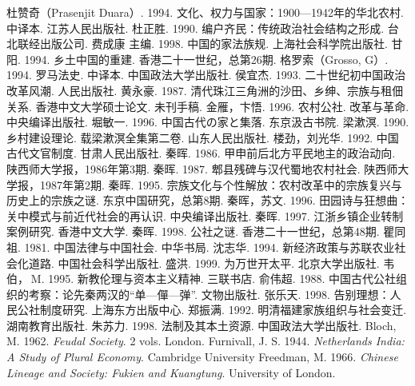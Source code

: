 \documentclass[a4paper,12pt,punct=kaiming,fontset=none]{ctexart}
\begin{document}
\begin{thebibliography}{99}
 杜赞奇（Prasenjit Duara）. 1994. 文化、权力与国家：1900—1942年的华北农村. 中译本. 江苏人民出版社.
 杜正胜. 1990. 编户齐民：传统政治社会结构之形成. 台北联经出版公司.
 费成康 主编. 1998. 中国的家法族规. 上海社会科学院出版社.
 甘阳. 1994. 乡土中国的重建. 香港二十一世纪，总第26期.
 格罗索（Grosso, G）. 1994. 罗马法史. 中译本. 中国政法大学出版社.
 侯宜杰. 1993. 二十世纪初中国政治改革风潮. 人民出版社.
 黄永豪. 1987. 清代珠江三角洲的沙田、乡绅、宗族与租佃关系. 香港中文大学硕士论文. 未刊手稿.
 金雁，卞悟. 1996. 农村公社. 改革与革命. 中央编译出版社.
 堀敏一. 1996. 中国古代の家と集落. 东京汲古书院.
 梁漱溟. 1990. 乡村建设理论. 载梁漱溟全集第二卷. 山东人民出版社.
 楼劲，刘光华. 1992. 中国古代文官制度. 甘肃人民出版社.
 秦晖. 1986. 甲申前后北方平民地主的政治动向. 陕西师大学报，1986年第3期.
 秦晖. 1987. 郫县残碑与汉代蜀地农村社会. 陕西师大学报，1987年第2期.
 秦晖. 1995. 宗族文化与个性解放：农村改革中的宗族复兴与历史上的宗族之谜. 东京中国研究，总第8期.
 秦晖，苏文. 1996. 田园诗与狂想曲：关中模式与前近代社会的再认识. 中央编译出版社.
 秦晖. 1997. 江浙乡镇企业转制案例研究. 香港中文大学.
 秦晖. 1998. 公社之谜. 香港二十一世纪，总第48期.
 瞿同祖. 1981. 中国法律与中国社会. 中华书局.
 沈志华. 1994. 新经济政策与苏联农业社会化道路. 中国社会科学出版社.
 盛洪. 1999. 为万世开太平. 北京大学出版社.
 韦伯， M. 1995. 新教伦理与资本主义精神. 三联书店.
 俞伟超. 1988. 中国古代公社组织的考察：论先秦两汉的“单—僤—弹”. 文物出版社.
 张乐天. 1998. 告别理想：人民公社制度研究. 上海东方出版中心.
 郑振满. 1992. 明清福建家族组织与社会变迁. 湖南教育出版社.
 朱苏力. 1998. 法制及其本土资源. 中国政法大学出版社.
 Bloch, M. 1962. \textit{Feudal Society}. 2 vols. London.
 Furnivall, J. S. 1944. \textit{Netherlands India: A Study of Plural Economy}. Cambridge University
 Freedman, M. 1966. \textit{Chinese Lineage and Society: Fukien and Kuangtung}. University of London.

\end{thebibliography}
\end{document}
